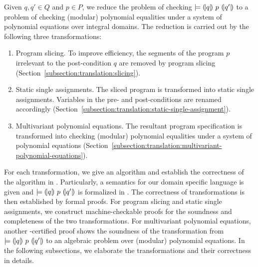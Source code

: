 
Given $q, q' \in Q$ and $p \in P$, we reduce the problem of checking
$\models {(\!|}{q}{|\!)}~{p}~{(\!|}{q'}{|\!)}$ to a problem of checking (modular)
polynomial equalities under a system of polynomial equations over
integral domains. The reduction is carried out by the following three
transformations:
\begin{enumerate}
\item Program slicing. To improve efficiency, the segments of the program $p$
  irrelevant to the post-condition $q$ are removed by program slicing 
  (Section~\ref{subsection:translation:slicing}). 
\item Static single assignments. The sliced program is transformed
  into static single assignments. Variables in the pre- and
  post-conditions are renamed accordingly
  (Section~\ref{subsection:translation:static-single-assignment}).
\item Multivariant polynomial equations. The resultant program
  specification is transformed into checking (modular)
  polynomial equalities under a system of polynomial equations
  (Section~\ref{subsection:translation:multivariant-polynomial-equations}).
\end{enumerate}

For each transformation, we give an algorithm and establish the
correctness of the algorithm in \coq. Particularly, a semantics
for our domain specific language is given and 
$\models {(\!|}{q}{|\!)}~{p}~{(\!|}{q'}{|\!)}$ is formalized in \coq. The
correctness of transformations is then established by formal \coq
proofs. For program slicing and static single assignments, we
construct machine-checkable proofs for the soundness and completeness
of the two transformations. For multivariant polynomial equations,
another \coq-certified proof shows the soundness of the transformation
from $\models {(\!|}{q}{|\!)}~{p}~{(\!|}{q'}{|\!)}$ to an algebraic problem over
(modular) polynomial equations. In the following subsections, we
elaborate the transformations and their correctness in details.